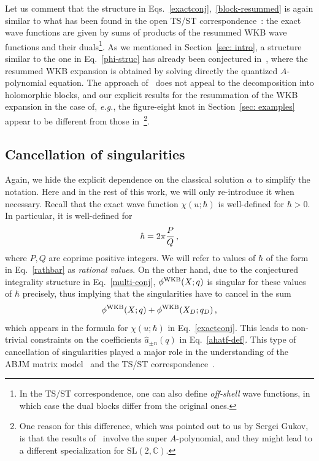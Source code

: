 \documentclass[a4paper,11pt]{article}
\theoremstyle{definition}
\def\IC{{\mathbb C}}
\newcommand{\be}{\begin{equation}}
\newcommand{\ee}{\end{equation}}
\begin{document}
Let us comment that the structure in Eqs.~\eqref{exactconj},~\eqref{block-resummed} is again similar to what has been found in the open TS/ST correspondence~\cite{kpamir, mz-wv, mz-wv2, szabolcs, fgrassi}: the exact wave functions are given by sums of products of the resummed WKB wave functions and their duals\footnote{In the TS/ST correspondence, one can also define {\it off-shell} wave functions, in which case the dual blocks differ from the original ones.}.
%
 As we mentioned in Section~\ref{sec: intro}, a structure similar to the one in Eq.~\eqref{phi-struc} has already been conjectured in~\cite{ekholm}, where the resummed WKB expansion is obtained by solving directly the quantized $A$-polynomial equation. The approach of~\cite{ekholm} does not appeal to the decomposition into holomorphic blocks, and our explicit results for the resummation of the WKB expansion in the case of, {\it e.g.}, the figure-eight knot in Section~\ref{sec: examples} appear to be different from those in~\cite{ekholm}\footnote{One reason for this difference, which was pointed out to us by Sergei Gukov, is that the results of~\cite{ekholm} involve the super $A$-polynomial, and they might lead to a different specialization for $\text{SL}(2,\IC)$.}. 

\subsection{Cancellation of singularities} \label{sec: cancellation}
Again, we hide the explicit dependence on the classical solution $\alpha$ to simplify the notation. Here and in the rest of this work, we will only re-introduce it when necessary.
%
Recall that the exact wave function $\chi(u;\hbar)$ is well-defined for $\hbar>0$. In particular, it is well-defined for
%
\be \label{rathbar}
\hbar = 2 \pi {P \over Q} \, ,
\ee
%
where $P, Q$ are coprime positive integers. We will refer to values of $\hbar$ of the form in Eq.~\eqref{rathbar} as {\it rational values}. 
On the other hand, due to the conjectured integrality structure in Eq.~\eqref{multi-conj}, $\phi^{\rm WKB} (X; q)$ is singular for these values of $\hbar$ precisely, thus implying that the singularities have to cancel in the sum
%
\be \label{phi-sum}
\phi^{\rm WKB} (X; q) +\phi^{\rm WKB} (X_D; q_D) \, ,
  \ee
which appears in the formula for $\chi(u;\hbar)$ in Eq.~\eqref{exactconj}.
This leads to non-trivial constraints on the coefficients $\hat a_{\pm n}(q)$ in Eq.~\eqref{ahatf-def}. This type of cancellation of singularities played a major role in the understanding of the ABJM matrix model~\cite{hmo2} and the TS/ST correspondence~\cite{km, ghm, wzh}. 
\end{document}
